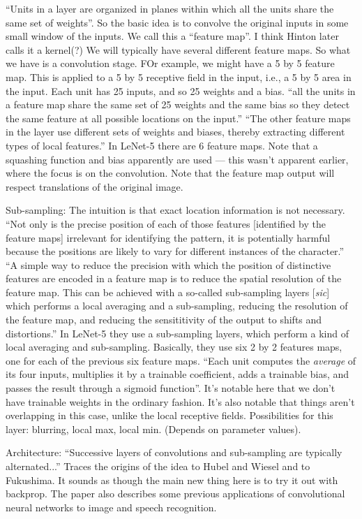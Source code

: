 \documentclass[12pt]{article}
\begin{document}
``Units in a layer are organized in planes within which all the units
share the same set of weights''.  So the basic idea is to convolve the
original inputs in some small window of the inputs.  We call this a
``feature map''.  I think Hinton later calls it a kernel(?)  We will
typically have several different feature maps.  So what we have is a
convolution stage.  FOr example, we might have a 5 by 5 feature map.
This is applied to a 5 by 5 receptive field in the input, i.e., a 5 by
5 area in the input.  Each unit has 25 inputs, and so 25 weights and a
bias.  ``all the units in a feature map share the same set of 25
weights and the same bias so they detect the same feature at all
possible locations on the input.''  ``The other feature maps in the
layer use different sets of weights and biases, thereby extracting
different types of local features.''  In LeNet-5 there are 6 feature
maps.  Note that a squashing function and bias apparently are used ---
this wasn't apparent earlier, where the focus is on the convolution.
Note that the feature map output will respect translations of the
original image.

Sub-sampling: The intuition is that exact location information is not
necessary.  ``Not only is the precise position of each of those
features [identified by the feature maps] irrelevant for identifying
the pattern, it is potentially harmful because the positions are
likely to vary for different instances of the character.''  ``A simple
way to reduce the precision with which the position of distinctive
features are encoded in a feature map is to reduce the spatial
resolution of the feature map.  This can be achieved with a so-called
sub-sampling layers [\emph{sic}] which performs a local averaging and
a sub-sampling, reducing the resolution of the feature map, and
reducing the sensititivity of the output to shifts and distortions.''
In LeNet-5 they use a sub-sampling layers, which perform a kind of
local averaging and sub-sampling.  Basically, they use six 2 by 2
features maps, one for each of the previous six feature maps.  ``Each
unit computes the \emph{average} of its four inputs, multiplies it by
a trainable coefficient, adds a trainable bias, and passes the result
through a sigmoid function''.  It's notable here that we don't have
trainable weights in the ordinary fashion.  It's also notable that
things aren't overlapping in this case, unlike the local receptive
fields.  Possibilities for this layer: blurring, local max, local min.
(Depends on parameter values).  

Architecture: ``Successive layers of convolutions and sub-sampling are
typically alternated...''  Traces the origins of the idea to Hubel and
Wiesel and to Fukushima.  It sounds as though the main new thing here
is to try it out with backprop.  The paper also describes some
previous applications of convolutional neural networks to image and
speech recognition.
\end{document}
